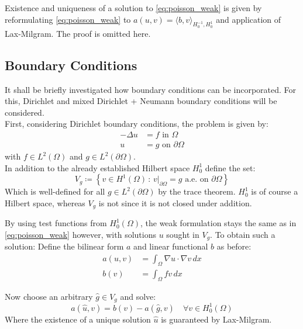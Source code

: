 \documentclass[11pt,a4paper]{article}
\begin{document}
\begin{multicols}{2}
Existence and uniqueness of a solution to \autoref{eq:poisson_weak} is given by
reformulating \autoref{eq:poisson_weak} to $a(u,v) = \langle b,v \rangle_{H^{-1}_0, H^1_0}$
and application of Lax-Milgram. The proof is omitted here.


\subsection*{Boundary Conditions}
It shall be briefly investigated how boundary conditions can be incorporated.
For this, Dirichlet and mixed Dirichlet + Neumann boundary conditions will be
considered.\\
First, considering Dirichlet boundary conditions, the problem is given by:
\begin{equation} \label{eq:poisson_dirichlet}
  \begin{split}
    -\Delta u &= f  \text{ in } \Omega\\
    u &= g \text{ on } \partial\Omega
  \end{split}
\end{equation}
with $f \in L^2(\Omega)$ and $g \in L^2(\partial\Omega)$.\\
In addition to the already established Hilbert space $H^1_0$ define the set:
\begin{equation*}
    V_g \coloneqq \left\{ v \in H^1(\Omega)\, :\, v\vert_{\partial\Omega} = g \text{ a.e. on } \partial\Omega\right\}
\end{equation*}
Which is well-defined for all $g \in L^2(\partial\Omega)$ by the trace
theorem. $H^1_0$ is of course a Hilbert space, whereas $V_g$ is not since it is
not closed under addition.

By using test functions from $H^1_0(\Omega)$, the weak formulation stays the
same as in \autoref{eq:poisson_weak} however, with solutions $u$ sought in $V_g$.
To obtain such a solution: Define the bilinear form $a$ and linear
functional $b$ as before:
\begin{equation*}
  \begin{split}
    a(u,v) &= \int_\Omega \nabla u \cdot \nabla v \,dx\\
    b(v)   &= \int_\Omega fv\,dx
  \end{split}
\end{equation*}

Now choose an arbitrary $\hat{g}\in V_g$ and solve:
\begin{equation*}
  a(\hat{u},v) = b(v) - a(\hat{g},v) \quad \forall v \in H^1_0(\Omega)
\end{equation*}
Where the existence of a unique solution $\hat{u}$ is guaranteed by Lax-Milgram.


\end{multicols}
\end{document}
